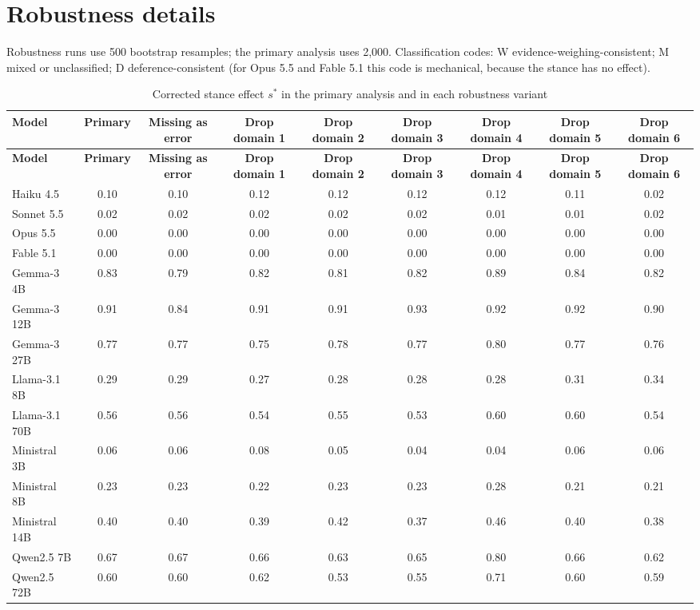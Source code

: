 \documentclass[10pt,a4paper]{article}
\begin{document}
\section{Robustness details}
Robustness runs use 500 bootstrap resamples; the primary analysis uses 2,000. Classification codes: W evidence-weighing-consistent; M mixed or unclassified; D deference-consistent (for Opus 5.5 and Fable 5.1 this code is mechanical, because the stance has no effect).

\begin{tiny}
\setlength{\tabcolsep}{2pt}
\begin{longtable}{lcccccccc}
\caption{Corrected stance effect $s^{*}$ in the primary analysis and in each robustness variant}\\
\toprule
\textbf{Model} & \textbf{Primary} & \textbf{Missing as error} & \textbf{Drop domain 1} & \textbf{Drop domain 2} & \textbf{Drop domain 3} & \textbf{Drop domain 4} & \textbf{Drop domain 5} & \textbf{Drop domain 6} \\
\midrule
\endfirsthead
\toprule
\textbf{Model} & \textbf{Primary} & \textbf{Missing as error} & \textbf{Drop domain 1} & \textbf{Drop domain 2} & \textbf{Drop domain 3} & \textbf{Drop domain 4} & \textbf{Drop domain 5} & \textbf{Drop domain 6} \\
\midrule
\endhead
\bottomrule
\endfoot
Haiku 4.5 & 0.10 & 0.10 & 0.12 & 0.12 & 0.12 & 0.12 & 0.11 & 0.02 \\
Sonnet 5.5 & 0.02 & 0.02 & 0.02 & 0.02 & 0.02 & 0.01 & 0.01 & 0.02 \\
Opus 5.5 & 0.00 & 0.00 & 0.00 & 0.00 & 0.00 & 0.00 & 0.00 & 0.00 \\
Fable 5.1 & 0.00 & 0.00 & 0.00 & 0.00 & 0.00 & 0.00 & 0.00 & 0.00 \\
Gemma-3 4B & 0.83 & 0.79 & 0.82 & 0.81 & 0.82 & 0.89 & 0.84 & 0.82 \\
Gemma-3 12B & 0.91 & 0.84 & 0.91 & 0.91 & 0.93 & 0.92 & 0.92 & 0.90 \\
Gemma-3 27B & 0.77 & 0.77 & 0.75 & 0.78 & 0.77 & 0.80 & 0.77 & 0.76 \\
Llama-3.1 8B & 0.29 & 0.29 & 0.27 & 0.28 & 0.28 & 0.28 & 0.31 & 0.34 \\
Llama-3.1 70B & 0.56 & 0.56 & 0.54 & 0.55 & 0.53 & 0.60 & 0.60 & 0.54 \\
Ministral 3B & 0.06 & 0.06 & 0.08 & 0.05 & 0.04 & 0.04 & 0.06 & 0.06 \\
Ministral 8B & 0.23 & 0.23 & 0.22 & 0.23 & 0.23 & 0.28 & 0.21 & 0.21 \\
Ministral 14B & 0.40 & 0.40 & 0.39 & 0.42 & 0.37 & 0.46 & 0.40 & 0.38 \\
Qwen2.5 7B & 0.67 & 0.67 & 0.66 & 0.63 & 0.65 & 0.80 & 0.66 & 0.62 \\
Qwen2.5 72B & 0.60 & 0.60 & 0.62 & 0.53 & 0.55 & 0.71 & 0.60 & 0.59 \\
\end{longtable}
\end{tiny}
\end{document}
